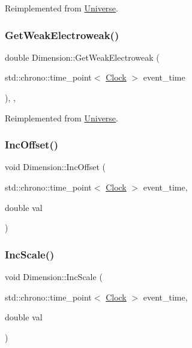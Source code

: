 Reimplemented from \mbox{\hyperlink{classUniverse_a4476b7e0a3fc1764909f556257fd9ec7}{Universe}}.

\mbox{\label{classDimension_a5bb5a164564013a60728854cc2e5ddb3}} 
\subsubsection{\texorpdfstring{Get\+Weak\+Electroweak()}{GetWeakElectroweak()}}
{\footnotesize\ttfamily double Dimension\+::\+Get\+Weak\+Electroweak (\begin{DoxyParamCaption}\item[{std\+::chrono\+::time\+\_\+point$<$ \mbox{\hyperlink{universe_8h_a0ef8d951d1ca5ab3cfaf7ab4c7a6fd80}{Clock}} $>$}]{event\+\_\+time }\end{DoxyParamCaption})\hspace{0.3cm}{\ttfamily [inline]}, {\ttfamily [final]}, {\ttfamily [virtual]}}



Reimplemented from \mbox{\hyperlink{classUniverse_a645299738e6b798a037f2a15a2e7cf4d}{Universe}}.

\mbox{\label{classDimension_aaf18cc220562b30f9e7aee92f16cc08e}} 
\subsubsection{\texorpdfstring{Inc\+Offset()}{IncOffset()}}
{\footnotesize\ttfamily void Dimension\+::\+Inc\+Offset (\begin{DoxyParamCaption}\item[{std\+::chrono\+::time\+\_\+point$<$ \mbox{\hyperlink{universe_8h_a0ef8d951d1ca5ab3cfaf7ab4c7a6fd80}{Clock}} $>$}]{event\+\_\+time,  }\item[{double}]{val }\end{DoxyParamCaption})}

\mbox{\label{classDimension_aa323eaa2c592e498d48e0739009ec313}} 
\subsubsection{\texorpdfstring{Inc\+Scale()}{IncScale()}}
{\footnotesize\ttfamily void Dimension\+::\+Inc\+Scale (\begin{DoxyParamCaption}\item[{std\+::chrono\+::time\+\_\+point$<$ \mbox{\hyperlink{universe_8h_a0ef8d951d1ca5ab3cfaf7ab4c7a6fd80}{Clock}} $>$}]{event\+\_\+time,  }\item[{double}]{val }\end{DoxyParamCaption})}

